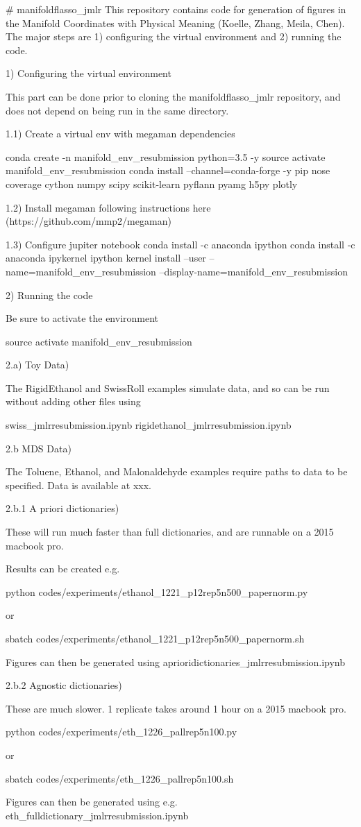 # manifoldflasso_jmlr
This repository contains code for generation of figures in the Manifold Coordinates with Physical Meaning (Koelle, Zhang, Meila, Chen).
The major steps are 1) configuring the virtual environment and 2) running the code.

1) Configuring the virtual environment

This part can be done prior to cloning the manifoldflasso_jmlr repository, and does not depend on being run in the same directory.

1.1) Create a virtual env with megaman dependencies

conda create -n manifold_env_resubmission python=3.5 -y
source activate manifold_env_resubmission
conda install --channel=conda-forge -y pip nose coverage cython numpy scipy scikit-learn pyflann pyamg h5py plotly

1.2) Install megaman following instructions here (https://github.com/mmp2/megaman)

1.3) Configure jupiter notebook
conda install -c anaconda ipython
conda install -c anaconda ipykernel
ipython kernel install --user --name=manifold_env_resubmission --display-name=manifold_env_resubmission

2) Running the code

Be sure to activate the environment

source activate manifold_env_resubmission

2.a) Toy Data)

The RigidEthanol and SwissRoll examples simulate data, and so can be run without adding other files using 

swiss_jmlrresubmission.ipynb
rigidethanol_jmlrresubmission.ipynb

2.b MDS Data)

The Toluene, Ethanol, and Malonaldehyde examples require paths to data to be specified.
 Data is available at xxx.

2.b.1 A priori  dictionaries)

These will run much faster than full dictionaries, and are runnable on a 2015 macbook pro.

Results can be created e.g.

python codes/experiments/ethanol_1221_p12rep5n500_papernorm.py

or

sbatch codes/experiments/ethanol_1221_p12rep5n500_papernorm.sh

Figures can then be generated using aprioridictionaries_jmlrresubmission.ipynb

2.b.2 Agnostic dictionaries)

These are much slower.  1 replicate takes around 1 hour on a 2015 macbook pro. 

python codes/experiments/eth_1226_pallrep5n100.py

or

sbatch codes/experiments/eth_1226_pallrep5n100.sh

Figures can then be generated using e.g. eth_fulldictionary_jmlrresubmission.ipynb






